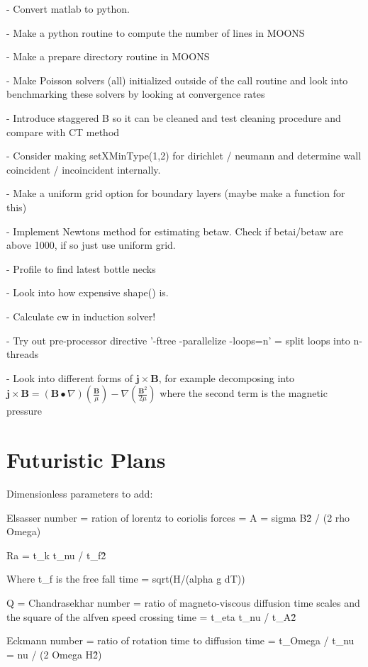 \documentclass[11pt]{article}
\begin{document}
- Convert matlab to python.

- Make a python routine to compute the number of lines in MOONS

- Make a prepare directory routine in MOONS

- Make Poisson solvers (all) initialized outside of the call routine and look into benchmarking these solvers by looking at convergence rates

- Introduce staggered B so it can be cleaned and test cleaning procedure and compare with CT method

- Consider making setXMinType(1,2) for dirichlet / neumann and determine wall coincident / incoincident internally.

- Make a uniform grid option for boundary layers (maybe make a function for this)

- Implement Newtons method for estimating betaw. Check if betai/betaw
are above 1000, if so just use uniform grid.

- Profile to find latest bottle necks

- Look into how expensive shape() is.

- Calculate cw in induction solver!

- Try out pre-processor directive '-ftree -parallelize -loops=n' = split loops into n-threads

- Look into different forms of $\mathbf{j}\times \mathbf{B}$, for example 
decomposing into $\mathbf{j}\times \mathbf{B} = (\mathbf{B}\bullet\nabla) \left(\frac{\mathbf{B}}{\mu}\right) - \nabla \left( \frac{\mathbf{B}^2}{2\mu} \right)$ where the second term is the magnetic pressure

\section{Futuristic Plans}

Dimensionless parameters to add:

Elsasser number = ration of lorentz to coriolis forces = A = sigma B\^2 / (2 rho Omega)

Ra = t\_k t\_nu / t\_f\^2

Where t\_f is the free fall time = sqrt(H/(alpha g dT))

Q = Chandrasekhar number = ratio of magneto-viscous diffusion time scales and the square of the alfven speed crossing time
 = t\_eta t\_nu / t\_A\^2

Eckmann number = ratio of rotation time to diffusion time
 = t\_Omega / t\_nu = nu / (2 Omega H\^2)
\end{document}
